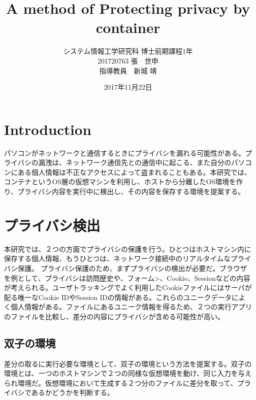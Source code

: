 \documentclass[a4paper,twocolumn,10pt]{jarticle}
\title{A method of Protecting privacy by container}
\author{システム情報工学研究科 博士前期課程1年\\201720763 張　世申\\ 指導教員　新城 靖}
\date{2017年11月22日}
\begin{document}
\maketitle

\pagestyle{plain}


\section{Introduction}
パソコンがネットワークと通信するときにプライバシを漏れる可能性がある。プライバシの漏洩は、ネットワーク通信先との通信中に起こる、また自分のパソコンにある個人情報は不正なアクセスによって盗まれることもある。本研究では、コンテナというOS層の仮想マシンを利用し、ホストから分離したOS環境を作り、プライバシ内容を実行中に検出し、その内容を保存する環境を提案する。
\section{プライバシ検出}
本研究では、２つの方面でプライバシの保護を行う。ひとつはホストマシン内に保存する個人情報、もうひとつは、ネットワーク接続中のリアルタイムなプライバシ保護。
プライバシ保護のため、まずプライバシの検出が必要だ。ブラウザを例として、プライバシは訪問歴史や、フォーム>、Cookie、Sessionなどの内容が考えられる。ユーザトラッキングでよく利用したCookieファイルにはサーバが配る唯一なCookie IDやSession IDの情報がある。これらのユニークデータによく個人情報がある。ファイルにあるユニーク情報を得るため、２つの実行アプリのファイルを比較し、差分の内容にプライバシが含める可能性が高い。
\subsection{双子の環境}
差分の取るに実行必要な環境として、双子の環境という方法を提案する。双子の環境とは、一つのホストマシンで２つの同様な仮想環境を動け、同じ入力を与えられ環境だ。仮想環境において生成する２つ分のファイルに差分を取って、プライバシであるかどうかを判断する。
\end{document}
